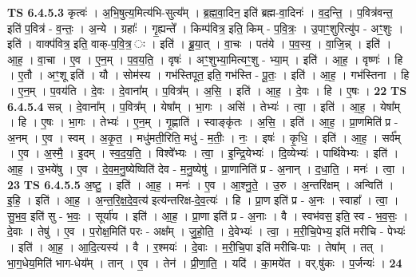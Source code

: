 \documentclass[17pt]{extarticle}
\begin{document}
                  \newline
                                \textbf{ TS 6.4.5.3} \newline
                  कृत्वः॑ । अ॒भि॒षुत्य॒मित्य॑भि-सुत्य᳚म् । ब्र॒ह्म॒वा॒दिन॒ इति॑ ब्रह्म-वा॒दिनः॑ । व॒द॒न्ति॒ । प॒वित्र॑वन्त॒ इति॑ प॒वित्र॑ - व॒न्तः॒ । अ॒न्ये । ग्रहाः᳚ । गृ॒ह्यन्ते᳚ । किम्प॑वित्र॒ इति॒ किम् - प॒वि॒त्रः॒ । उ॒पाꣳ॒॒शुरित्यु॑प - अꣳ॒॒शुः । इति॑ । वाक्प॑वित्र॒ इति॒ वाक्-प॒वि॒त्र॒ ः । इति॑ । ब्रू॒या॒त् । वा॒चः । पत॑ये । प॒व॒स्व॒ । वा॒जि॒न्न् । इति॑ । आ॒ह॒ । वा॒चा । ए॒व । ए॒न॒म् । प॒व॒य॒ति॒ । वृषः॑ । अꣳ॒॒शुभ्या॒मित्यꣳ॒॒शु - भ्या॒म् । इति॑ । आ॒ह॒ । वृष्णः॑ । हि । ए॒तौ । अꣳ॒॒शू इति॑ । यौ । सोम॑स्य । गभ॑स्तिपूत॒ इति॒ गभ॑स्ति - पू॒तः॒ । इति॑ । आ॒ह॒ । गभ॑स्तिना । हि । ए॒न॒म् । प॒वय॑ति । दे॒वः । दे॒वाना᳚म् । प॒वित्र᳚म् । अ॒सि॒ । इति॑ । आ॒ह॒ । दे॒वः । हि । ए॒षः । \textbf{  22} \newline
                  \newline
                                \textbf{ TS 6.4.5.4} \newline
                  सन्न् । दे॒वाना᳚म् । प॒वित्र᳚म् । येषा᳚म् । भा॒गः । असि॑ । तेभ्यः॑ । त्वा॒ । इति॑ । आ॒ह॒ । येषा᳚म् । हि । ए॒षः । भा॒गः । तेभ्यः॑ । ए॒न॒म् । गृ॒ह्णाति॑ । स्वाङ्कृ॑तः । अ॒सि॒ । इति॑ । आ॒ह॒ । प्रा॒णमिति॑ प्र - अ॒नम् । ए॒व । स्वम् । अ॒कृ॒त॒ । मधु॑मती॒रिति॒ मधु॑ - म॒तीः॒ । नः॒ । इषः॑ । कृ॒धि॒ । इति॑ । आ॒ह॒ । सर्व᳚म् । ए॒व । अ॒स्मै॒ । इ॒दम् । स्व॒द॒य॒ति॒ । विश्वे᳚भ्यः । त्वा॒ । इ॒न्द्रि॒येभ्यः॑ । दि॒व्येभ्यः॑ । पार्थि॑वेभ्यः । इति॑ । आ॒ह॒ । उ॒भये॑षु । ए॒व । दे॒व॒म॒नु॒ष्येष्विति॑ देव - म॒नु॒ष्येषु॑ । प्रा॒णानिति॑ प्र - अ॒नान् । द॒धा॒ति॒ । मनः॑ । त्वा॒ । \textbf{  23} \newline
                  \newline
                                \textbf{ TS 6.4.5.5} \newline
                  अ॒ष्टु॒ । इति॑ । आ॒ह॒ । मनः॑ । ए॒व । आ॒श्नु॒ते॒ । उ॒रु । अ॒न्तरि॑क्षम् । अन्विति॑ । इ॒हि॒ । इति॑ । आ॒ह॒ । अ॒न्त॒रि॒क्ष॒दे॒व॒त्य॑ इत्य॑न्तरिक्ष-दे॒व॒त्यः॑ । हि । प्रा॒ण इति॑ प्र - अ॒नः । स्वाहा᳚ । त्वा॒ । सु॒भ॒व॒ इति॑ सु - भ॒वः॒ । सूर्या॑य । इति॑ । आ॒ह॒ । प्रा॒णा इति॑ प्र - अ॒नाः । वै । स्वभ॑वस॒ इति॒ स्व - भ॒व॒सः॒ । दे॒वाः । तेषु॑ । ए॒व । प॒रोक्ष॒मिति॑ परः - अक्ष᳚म् । जु॒हो॒ति॒ । दे॒वेभ्यः॑ । त्वा॒ । म॒री॒चि॒पेभ्य॒ इति॑ मरीचि - पेभ्यः॑ । इति॑ । आ॒ह॒ । आ॒दि॒त्यस्य॑ । वै । र॒श्मयः॑ । दे॒वाः । म॒री॒चि॒पा इति॑ मरीचि-पाः । तेषा᳚म् । तत् । भा॒ग॒धेय॒मिति॑ भाग-धेय᳚म् । तान् । ए॒व । तेन॑ । प्री॒णा॒ति॒ । यदि॑ । का॒मये॑त । वर्.षु॑कः । प॒र्जन्यः॑ । \textbf{  24} \newline
\end{document}
